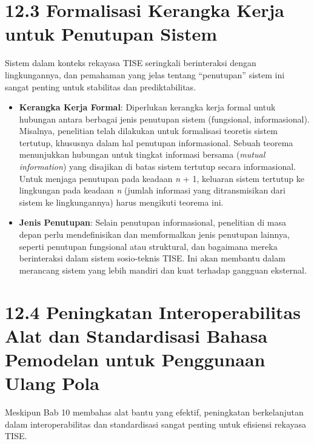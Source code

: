 \documentclass[
  letterpaper,
  DIV=11,
  numbers=noendperiod]{scrreprt}
\providecommand{\tightlist}{%
  \setlength{\itemsep}{0pt}\setlength{\parskip}{0pt}}
\begin{document}
\section{\texorpdfstring{\textbf{12.3 Formalisasi Kerangka Kerja untuk
Penutupan
Sistem}}{12.3 Formalisasi Kerangka Kerja untuk Penutupan Sistem}}\label{formalisasi-kerangka-kerja-untuk-penutupan-sistem}

Sistem dalam konteks rekayasa TISE seringkali berinteraksi dengan
lingkungannya, dan pemahaman yang jelas tentang ``penutupan'' sistem ini
sangat penting untuk stabilitas dan prediktabilitas.

\begin{itemize}
\tightlist
\item
  \textbf{Kerangka Kerja Formal}: Diperlukan kerangka kerja formal untuk
  hubungan antara berbagai jenis penutupan sistem (fungsional,
  informasional). Misalnya, penelitian telah dilakukan untuk formalisasi
  teoretis sistem tertutup, khususnya dalam hal penutupan informasional.
  Sebuah teorema menunjukkan hubungan untuk tingkat informasi bersama
  (\emph{mutual information}) yang disajikan di batas sistem tertutup
  secara informasional. Untuk menjaga penutupan pada keadaan \emph{n} +
  1, keluaran sistem tertutup ke lingkungan pada keadaan \emph{n}
  (jumlah informasi yang ditransmisikan dari sistem ke lingkungannya)
  harus mengikuti teorema ini.
\item
  \textbf{Jenis Penutupan}: Selain penutupan informasional, penelitian
  di masa depan perlu mendefinisikan dan memformalkan jenis penutupan
  lainnya, seperti penutupan fungsional atau struktural, dan bagaimana
  mereka berinteraksi dalam sistem sosio-teknis TISE. Ini akan membantu
  dalam merancang sistem yang lebih mandiri dan kuat terhadap gangguan
  eksternal.
\end{itemize}

\section{\texorpdfstring{\textbf{12.4 Peningkatan Interoperabilitas Alat
dan Standardisasi Bahasa Pemodelan untuk Penggunaan Ulang
Pola}}{12.4 Peningkatan Interoperabilitas Alat dan Standardisasi Bahasa Pemodelan untuk Penggunaan Ulang Pola}}\label{peningkatan-interoperabilitas-alat-dan-standardisasi-bahasa-pemodelan-untuk-penggunaan-ulang-pola}

Meskipun Bab 10 membahas alat bantu yang efektif, peningkatan
berkelanjutan dalam interoperabilitas dan standardisasi sangat penting
untuk efisiensi rekayasa TISE.
\end{document}
